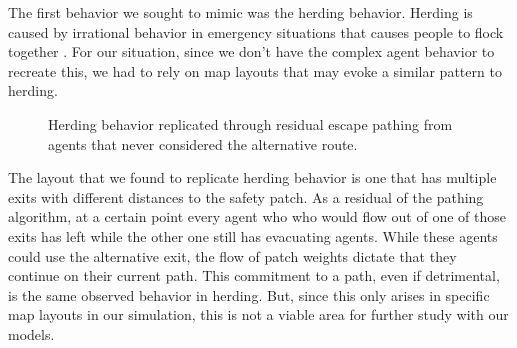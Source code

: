 \documentclass[12pt,letterpaper]{article}
\begin{document}
The first behavior we sought to mimic was the herding behavior.  Herding is caused by irrational behavior in emergency situations that causes people to flock together \cite{almeidaCrowdSimulationModeling2013}.  For our situation, since we don't have the complex agent behavior to recreate this, we had to rely on map layouts that may evoke a similar pattern to herding.

\begin{figure}[!ht]
  \centering
  \hfill
  \caption{Herding behavior replicated through residual escape pathing from agents that never considered the alternative route.}
\end{figure}

The layout that we found to replicate herding behavior is one that has multiple exits with different distances to the safety patch.  As a residual of the pathing algorithm, at a certain point every agent who who would flow out of one of those exits has left while the other one still has evacuating agents.  While these agents could use the alternative exit, the flow of patch weights dictate that they continue on their current path.  This commitment to a path, even if detrimental, is the same observed behavior in herding.  But, since this only arises in specific map layouts in our simulation, this is not a viable area for further study with our models. 
\end{document}
